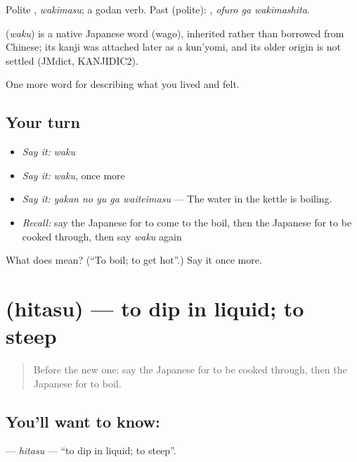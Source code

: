 Polite \textbf{}, \emph{wakimasu}; a godan verb. Past (polite): \textbf{ }, \emph{ofuro ga wakimashita}.

\begin{cousinweb}
\textbf{} (\emph{waku}) is a native Japanese word (wago), inherited rather than borrowed from Chinese; its kanji was attached later as a kun'yomi, and its older origin is not settled (JMdict, KANJIDIC2).
\end{cousinweb}

\begin{grammarlens}[title={What you've built}]
One more word for describing what you lived and felt.
\end{grammarlens}

\subsection*{Your turn}
\begin{itemize}
\raggedright
  \item \emph{Say it:} \emph{waku}
  \item \emph{Say it:} \emph{waku}, once more
  \item \emph{Say it:} \emph{yakan no yu ga waiteimasu} — The water in the kettle is boiling.
  \item \emph{Recall:} say the Japanese for to come to the boil, then the Japanese for to be cooked through, then say \emph{waku} again
\end{itemize}

\begin{tcolorbox}[breakable,colback=teal!4,colframe=teal!35!black,title={Before you move on}]
What does  mean? (\textquotedblleft{}To boil; to get hot\textquotedblright{}.) Say it once more.
\end{tcolorbox}
\section[\texorpdfstring{\ja{ひたす} (hitasu)}{ひたす (hitasu)}]{ (hitasu) — to dip in liquid; to steep}

\label{lesson:JA-C492-hitasu}



\begin{quote}
Before the new one: say the Japanese for to be cooked through, then the Japanese for to boil.
\end{quote}

\subsection*{You'll want to know: }
\textbf{} — \emph{hitasu} — \textquotedblleft{}to dip in liquid; to steep\textquotedblright{}.

